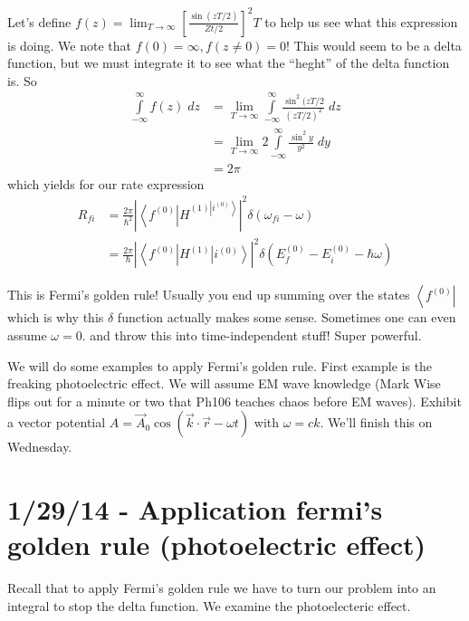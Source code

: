 \documentclass[10pt]{report}
\newcommand{\bra}[1]{\left<#1\right|}
\newcommand{\ket}[1]{\left|#1\right>}
\newcommand{\abs}[1]{\left|#1\right|}
\begin{document}
Let's define $f(z) = \lim_{T \to \infty}\left[ \frac{\sin(zT/2)}{Zt/2} \right]^2T$ to help us see what this expression is doing. We note that $f(0) = \infty, f(z \neq 0) = 0$! This would seem to be a delta function, but we must integrate it to see what the ``heght'' of the delta function is. So
\begin{align}
    \displaystyle\int\limits_{-\infty}^{\infty}f(z)\;dz &= \lim_{T \to \infty}\displaystyle\int\limits_{-\infty}^{\infty}\frac{\sin^2(zT/2}{(zT/2)^2}\;dz\\
    &= \lim_{T \to \infty}2\displaystyle\int\limits_{-\infty}^{\infty}\frac{\sin^2y}{y^2}\;dy\\
    &= 2\pi
    \label{1.27.fermiprime}
\end{align}
which yields for our rate expression
\begin{align}
    R_{fi} &= \frac{2\pi}{\hbar^2}\abs{\bra{f^{(0)}}H^{(1)\ket{i^{(0)}}}}^2\delta(\omega_{fi} - \omega)\\
    &= \frac{2\pi}{\hbar}\abs{\bra{f^{(0)}}H^{(1)}\ket{i^{(0)}}}^2\delta\left( E_f^{(0)} - E_i^{(0)} - \hbar\omega \right)
    \label{1.27.fermi}
\end{align}

This is Fermi's golden rule! Usually you end up summing over the states $\bra{f^{(0)}}$ which is why this $\delta$ function actually makes some sense. Sometimes one can even assume $\omega = 0$. and throw this into time-independent stuff! Super powerful.

We will do some examples to apply Fermi's golden rule. First example is the freaking photoelectric effect. We will assume EM wave knowledge (Mark Wise flips out for a minute or two that Ph106 teaches chaos before EM waves). Exhibit a vector potential $A = \vec{A}_0\cos\left( \vec{k}\cdot \vec{r} - \omega t \right)$ with $\omega = ck$. We'll finish this on Wednesday. 

\chapter{1/29/14 - Application fermi's golden rule (photoelectric effect)}

Recall that to apply Fermi's golden rule we have to turn our problem into an integral to stop the delta function. We examine the photoelecteric effect.
\end{document}
